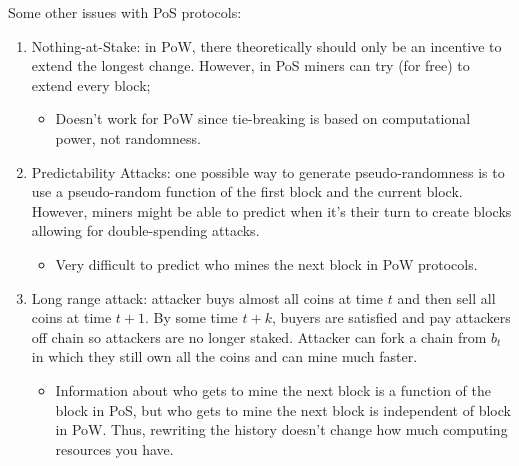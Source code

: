 \documentclass[dvipsnames]{article}
\theoremstyle{definition}
\theoremstyle{remark}
\begin{document}
Some other issues with PoS protocols:
\begin{enumerate}
	\item Nothing-at-Stake: in PoW, there theoretically should only be an incentive to extend the longest change. However, in PoS miners can try (for free) to extend every block;
	\begin{itemize}
		\item Doesn't work for PoW since tie-breaking is based on computational power, not randomness.
	\end{itemize}
	\item Predictability Attacks: one possible way to generate pseudo-randomness is to use a pseudo-random function of the first block and the current block. However, miners might be able to predict when it's their turn to create blocks allowing for double-spending attacks.
	\begin{itemize}
		\item Very difficult to predict who mines the next block in PoW protocols.
	\end{itemize}
	\item Long range attack: attacker buys almost all coins at time $t$ and then sell all coins at time $t+1$. By some time $t+k$, buyers are satisfied and pay attackers off chain so attackers are no longer staked. Attacker can fork a chain from $b_t$ in which they still own all the coins and can mine much faster.
	\begin{itemize}
		\item Information about who gets to mine the next block is a function of the block in PoS, but who gets to mine the next block is independent of block in PoW. Thus, rewriting the history doesn't change how much computing resources you have.
	\end{itemize}
\end{enumerate}
\end{document}
